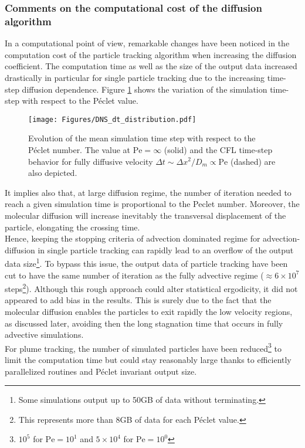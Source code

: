\subsubsection{Comments on the computational cost of the diffusion algorithm}
In a computational point of view, remarkable changes have been noticed in the computation cost of the particle tracking algorithm when increasing the diffusion coefficient.
The computation time as well as the size of the output data increased drastically in particular for single particle tracking due to the increasing time-step diffusion dependence.
Figure \ref{fig:time_step_pe} shows the variation of the simulation time-step with respect to the Péclet value. 
\begin{figure}[h!]
	\centering
	\texttt{[image: Figures/DNS\_dt\_distribution.pdf]}
	\caption{Evolution of the mean simulation time step with respect to the Péclet number. The value at $\mathrm{Pe} = \infty$ (solid) and the CFL time-step behavior for fully diffusive velocity $\Delta t\sim \Delta x^2/D_m \propto\mathrm{Pe}$ (dashed) are also depicted.}
	\label{fig:time_step_pe}
\end{figure}
It implies also that, at large diffusion regime, the number of iteration needed to reach a given simulation time is proportional to the Peclet number.
Moreover, the molecular diffusion will increase inevitably the transversal displacement of the particle, 
elongating the crossing time.\\
Hence, keeping the stopping criteria of advection dominated regime for advection-diffusion in single particle tracking can rapidly lead to an overflow of the output data size\footnote{Some simulations output up to 50GB of data without terminating.}.
To bypass this issue, the output data of particle tracking have been cut to have the same number of iteration as the fully advective regime ($\approx6 \times 10^7$ steps\footnote{This represents more than 8GB of data for each Péclet value.}). 
Although this rough approach could alter statistical ergodicity, it did not appeared to add bias in the results. 
This is surely due to the fact that the molecular diffusion enables the particles to exit rapidly the low velocity regions, as discussed later, avoiding then the long stagnation time that occurs in fully advective simulations.\\
For plume tracking, the number of simulated particles have been reduced\footnote{$10^5$ for $\mathrm{Pe}=10^1$ and $5\times10^4$ for $\mathrm{Pe}=10^0$} to limit the computation time but could stay reasonably large thanks to efficiently parallelized routines and Péclet invariant output size.

